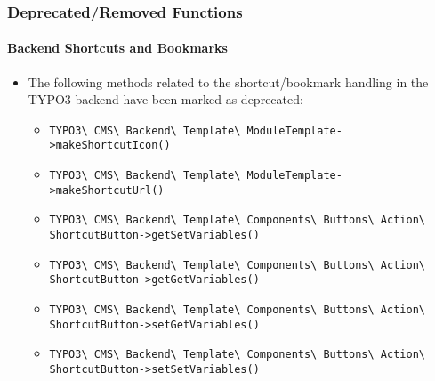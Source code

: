 %

\begin{frame}[fragile]
	\frametitle{Deprecated/Removed Functions}
	\framesubtitle{Backend Shortcuts and Bookmarks}

	\begin{itemize}
		\item The following methods related to the shortcut/bookmark handling in
			the TYPO3 backend have been marked as deprecated:
			\vspace{0.2cm}
			\begin{itemize}\tiny
				\item \texttt{TYPO3\textbackslash
					CMS\textbackslash
					Backend\textbackslash
					Template\textbackslash
					ModuleTemplate->makeShortcutIcon()}
				\item \texttt{TYPO3\textbackslash
					CMS\textbackslash
					Backend\textbackslash
					Template\textbackslash
					ModuleTemplate->makeShortcutUrl()}
				\item \texttt{TYPO3\textbackslash
					CMS\textbackslash
					Backend\textbackslash
					Template\textbackslash
					Components\textbackslash
					Buttons\textbackslash
					Action\textbackslash
					ShortcutButton->getSetVariables()}
				\item \texttt{TYPO3\textbackslash
					CMS\textbackslash
					Backend\textbackslash
					Template\textbackslash
					Components\textbackslash
					Buttons\textbackslash
					Action\textbackslash
					ShortcutButton->getGetVariables()}
				\item \texttt{TYPO3\textbackslash
					CMS\textbackslash
					Backend\textbackslash
					Template\textbackslash
					Components\textbackslash
					Buttons\textbackslash
					Action\textbackslash
					ShortcutButton->setGetVariables()}
				\item \texttt{TYPO3\textbackslash
					CMS\textbackslash
					Backend\textbackslash
					Template\textbackslash
					Components\textbackslash
					Buttons\textbackslash
					Action\textbackslash
					ShortcutButton->setSetVariables()}
			\end{itemize}\normalsize


\end{itemize}
\end{frame}
